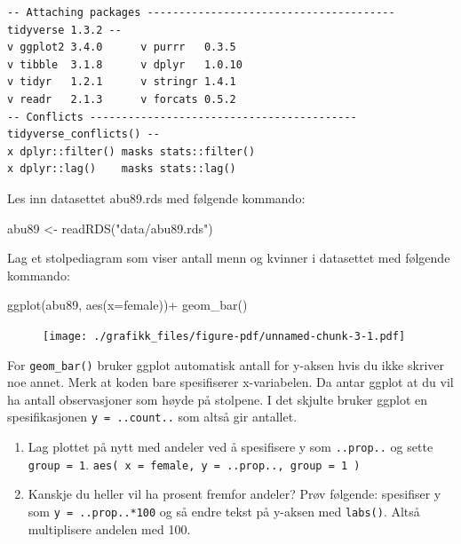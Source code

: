 \documentclass[
  letterpaper,
  DIV=11,
  numbers=noendperiod]{scrreprt}
\newenvironment{Shaded}{\begin{snugshade}}{\end{snugshade}}
\newcommand{\AttributeTok}[1]{\textcolor[rgb]{0.40,0.45,0.13}{#1}}
\newcommand{\FunctionTok}[1]{\textcolor[rgb]{0.28,0.35,0.67}{#1}}
\newcommand{\NormalTok}[1]{\textcolor[rgb]{0.00,0.23,0.31}{#1}}
\newcommand{\OtherTok}[1]{\textcolor[rgb]{0.00,0.23,0.31}{#1}}
\newcommand{\SpecialCharTok}[1]{\textcolor[rgb]{0.37,0.37,0.37}{#1}}
\newcommand{\StringTok}[1]{\textcolor[rgb]{0.13,0.47,0.30}{#1}}
\begin{document}
\begin{verbatim}
-- Attaching packages --------------------------------------- tidyverse 1.3.2 --
v ggplot2 3.4.0      v purrr   0.3.5 
v tibble  3.1.8      v dplyr   1.0.10
v tidyr   1.2.1      v stringr 1.4.1 
v readr   2.1.3      v forcats 0.5.2 
-- Conflicts ------------------------------------------ tidyverse_conflicts() --
x dplyr::filter() masks stats::filter()
x dplyr::lag()    masks stats::lag()
\end{verbatim}

Les inn datasettet abu89.rds med følgende kommando:

\begin{Shaded}
\begin{Highlighting}[]
\NormalTok{abu89 }\OtherTok{\textless{}{-}} \FunctionTok{readRDS}\NormalTok{(}\StringTok{"data/abu89.rds"}\NormalTok{) }
\end{Highlighting}
\end{Shaded}

Lag et stolpediagram som viser antall menn og kvinner i datasettet med
følgende kommando:

\begin{Shaded}
\begin{Highlighting}[]
\FunctionTok{ggplot}\NormalTok{(abu89, }\FunctionTok{aes}\NormalTok{(}\AttributeTok{x=}\NormalTok{female))}\SpecialCharTok{+}
  \FunctionTok{geom\_bar}\NormalTok{()}
\end{Highlighting}
\end{Shaded}

\begin{figure}[H]

{\centering \texttt{[image: ./grafikk\_files/figure-pdf/unnamed-chunk-3-1.pdf]}

}

\end{figure}

For \texttt{geom\_bar()} bruker ggplot automatisk antall for y-aksen
hvis du ikke skriver noe annet. Merk at koden bare spesifiserer
x-variabelen. Da antar ggplot at du vil ha antall observasjoner som
høyde på stolpene. I det skjulte bruker ggplot en spesifikasjonen
\texttt{y\ =\ ..count..} som altså gir antallet.

\begin{enumerate}
\def\labelenumi{\arabic{enumi}.}
\setcounter{enumi}{9}
\item
  Lag plottet på nytt med andeler ved å spesifisere y som
  \texttt{..prop..} og sette \texttt{group\ =\ 1}.
  \texttt{aes(\ x\ =\ female,\ y\ =\ ..prop..,\ group\ =\ 1\ )}
\item
  Kanskje du heller vil ha prosent fremfor andeler? Prøv følgende:
  spesifiser y som \texttt{y\ =\ ..prop..*100} og så endre tekst på
  y-aksen med \texttt{labs()}. Altså multiplisere andelen med 100.
\end{enumerate}
\end{document}
